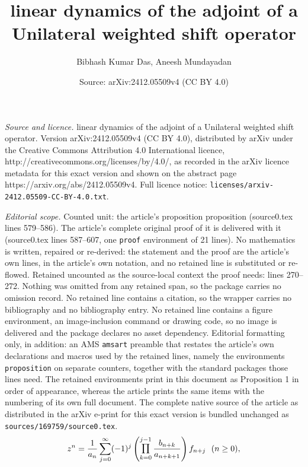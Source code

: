 \documentclass[10pt,a4paper]{amsart}
\title{linear dynamics of the adjoint of a Unilateral {weighted shift operator}}
\author{Bibhash Kumar Das, Aneesh Mundayadan}
\date{Source: arXiv:2412.05509v4 (CC BY 4.0)}
\DeclareMathOperator*{\Mprod}{\text{\raisebox{0.25ex}{\scalebox{0.8}{$\prod$}}}}
\begin{document}
\maketitle

\noindent\emph{Source and licence.} linear dynamics of the adjoint of a Unilateral {weighted shift operator}. Version arXiv:2412.05509v4 (CC BY 4.0), distributed by arXiv under the Creative Commons Attribution 4.0 International licence, http://creativecommons.org/licenses/by/4.0/, as recorded in the arXiv licence metadata for this exact version and shown on the abstract page https://arxiv.org/abs/2412.05509v4. Full licence notice: \texttt{licenses/arxiv-2412.05509-CC-BY-4.0.txt}.\par\smallskip

\noindent\textit{Editorial scope.} Counted unit: the article's proposition proposition (source0.tex lines 579--586). The article's complete original proof of it is delivered with it (source0.tex lines 587--607, one \texttt{proof} environment of 21 lines). No mathematics is written, repaired or re-derived: the statement and the proof are the article's own lines, in the article's own notation, and no retained line is substituted or re-flowed.  Retained uncounted as the source-local context the proof needs: lines 270--272.  Nothing was omitted from any retained span, so the package carries no omission record.  No retained line contains a citation, so the wrapper carries no bibliography and no bibliography entry.  No retained line contains a figure environment, an image-inclusion command or drawing code, so no image is delivered and the package declares no asset dependency.  Editorial formatting only, in addition: an AMS \texttt{amsart} preamble that restates the article's own declarations and macros used by the retained lines, namely the environments \texttt{proposition} on separate counters, together with the standard packages those lines need.  The retained environments print in this document as Proposition 1 in order of appearance, whereas the article prints the same items with the numbering of its own full document.  The complete native source of the article as distributed in the arXiv e-print for this exact version is bundled unchanged as \texttt{sources/169759/source0.tex}.
\begin{equation}\label{monomial-expansion}
z^{n}=\frac{1}{a_{n}}\sum_{j=0}^{\infty}(-1)^{j}\left(\Mprod_{k=0}^{j-1}\frac{b_{n+k}}{a_{n+k+1}}\right)f_{n+j} \,\,\,\, (n\geq 0),
\end{equation}
\end{document}
